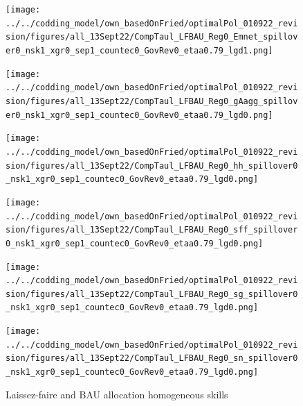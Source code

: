 \begin{figure}[h!!]
	\centering
	\caption{Laissez-faire and BAU allocation homogeneous skills }\label{fig:LF_BAU_nsk1}
	\begin{minipage}[]{0.32\textwidth}
		\texttt{[image: ../../codding\_model/own\_basedOnFried/optimalPol\_010922\_revision/figures/all\_13Sept22/CompTaul\_LFBAU\_Reg0\_Emnet\_spillover0\_nsk1\_xgr0\_sep1\_countec0\_GovRev0\_etaa0.79\_lgd1.png]}
	\end{minipage}	
	\begin{minipage}[]{0.32\textwidth}
		\texttt{[image: ../../codding\_model/own\_basedOnFried/optimalPol\_010922\_revision/figures/all\_13Sept22/CompTaul\_LFBAU\_Reg0\_gAagg\_spillover0\_nsk1\_xgr0\_sep1\_countec0\_GovRev0\_etaa0.79\_lgd0.png]}
	\end{minipage}	
	\begin{minipage}[]{0.32\textwidth}
		\texttt{[image: ../../codding\_model/own\_basedOnFried/optimalPol\_010922\_revision/figures/all\_13Sept22/CompTaul\_LFBAU\_Reg0\_hh\_spillover0\_nsk1\_xgr0\_sep1\_countec0\_GovRev0\_etaa0.79\_lgd0.png]}
	\end{minipage}	
	\begin{minipage}[]{0.32\textwidth}
		\texttt{[image: ../../codding\_model/own\_basedOnFried/optimalPol\_010922\_revision/figures/all\_13Sept22/CompTaul\_LFBAU\_Reg0\_sff\_spillover0\_nsk1\_xgr0\_sep1\_countec0\_GovRev0\_etaa0.79\_lgd0.png]}
	\end{minipage}		
	\begin{minipage}[]{0.32\textwidth}
		\texttt{[image: ../../codding\_model/own\_basedOnFried/optimalPol\_010922\_revision/figures/all\_13Sept22/CompTaul\_LFBAU\_Reg0\_sg\_spillover0\_nsk1\_xgr0\_sep1\_countec0\_GovRev0\_etaa0.79\_lgd0.png]}
	\end{minipage}	
	\begin{minipage}[]{0.32\textwidth}
		\texttt{[image: ../../codding\_model/own\_basedOnFried/optimalPol\_010922\_revision/figures/all\_13Sept22/CompTaul\_LFBAU\_Reg0\_sn\_spillover0\_nsk1\_xgr0\_sep1\_countec0\_GovRev0\_etaa0.79\_lgd0.png]}

\end{minipage}
\end{figure}

